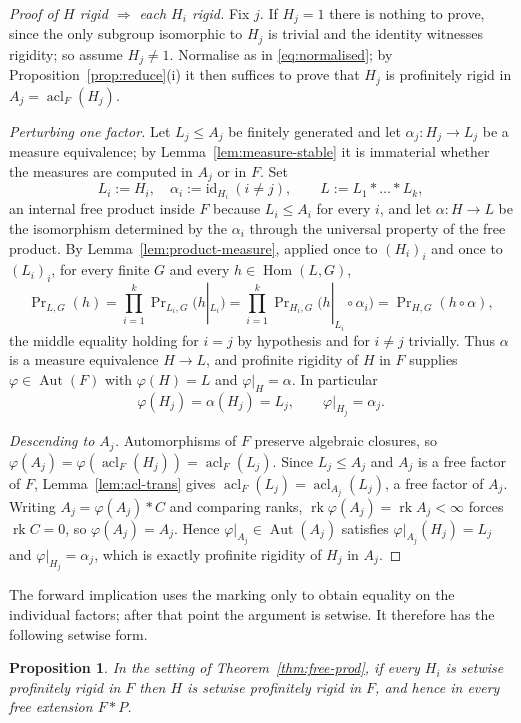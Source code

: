 \documentclass[11pt]{amsart}
\theoremstyle{plain}
\newtheorem{proposition}[theorem]{Proposition}
\theoremstyle{definition}
\newcommand{\acl}{\operatorname{acl}}
\newcommand{\rk}{\operatorname{rk}}
\newcommand{\Hom}{\operatorname{Hom}}
\newcommand{\Aut}{\operatorname{Aut}}
\begin{document}
\begin{proof}[Proof of $H$ rigid $\Rightarrow$ each $H_i$ rigid]
Fix $j$.  If $H_j=1$ there is nothing to prove, since the only subgroup
isomorphic to $H_j$ is trivial and the identity witnesses rigidity; so assume
$H_j\neq1$.  Normalise as in \eqref{eq:normalised}; by
Proposition~\ref{prop:reduce}(i) it then suffices to prove that $H_j$ is
profinitely rigid in $A_j=\acl_F(H_j)$.

\medskip\noindent\emph{Perturbing one factor.}  Let $L_j\le A_j$ be finitely
generated and let $\alpha_j\colon H_j\to L_j$ be a measure equivalence; by
Lemma~\ref{lem:measure-stable} it is immaterial whether the measures are computed
in $A_j$ or in $F$.  Set
\[
  L_i:=H_i,\quad\alpha_i:=\mathrm{id}_{H_i}\ (i\neq j),\qquad
  L:=L_1*\dots*L_k,
\]
an internal free product inside $F$ because $L_i\le A_i$ for every $i$, and let
$\alpha\colon H\to L$ be the isomorphism determined by the $\alpha_i$ through the
universal property of the free product.  By Lemma~\ref{lem:product-measure},
applied once to $(H_i)_i$ and once to $(L_i)_i$, for every finite $G$ and every
$h\in\Hom(L,G)$,
\[
  \Pr\nolimits_{L,G}(h)=\prod_{i=1}^{k}\Pr\nolimits_{L_i,G}\bigl(h|_{L_i}\bigr)
  =\prod_{i=1}^{k}\Pr\nolimits_{H_i,G}\bigl(h|_{L_i}\circ\alpha_i\bigr)
  =\Pr\nolimits_{H,G}(h\circ\alpha),
\]
the middle equality holding for $i=j$ by hypothesis and for $i\neq j$ trivially.
Thus $\alpha$ is a measure equivalence $H\to L$, and profinite
rigidity of $H$ in $F$ supplies $\varphi\in\Aut(F)$ with $\varphi(H)=L$ and
$\varphi|_H=\alpha$.  In particular
\[
  \varphi(H_j)=\alpha(H_j)=L_j,\qquad \varphi|_{H_j}=\alpha_j .
\]

\medskip\noindent\emph{Descending to $A_j$.}  Automorphisms of $F$ preserve
algebraic closures, so $\varphi(A_j)=\varphi(\acl_F(H_j))=\acl_F(L_j)$.  Since
$L_j\le A_j$ and $A_j$ is a free factor of $F$, Lemma~\ref{lem:acl-trans} gives
$\acl_F(L_j)=\acl_{A_j}(L_j)$, a free factor of $A_j$.  Writing
$A_j=\varphi(A_j)*C$ and comparing ranks, $\rk\varphi(A_j)=\rk A_j<\infty$ forces
$\rk C=0$, so $\varphi(A_j)=A_j$.  Hence $\varphi|_{A_j}\in\Aut(A_j)$ satisfies
$\varphi|_{A_j}(H_j)=L_j$ and $\varphi|_{H_j}=\alpha_j$, which is exactly
profinite rigidity of $H_j$ in $A_j$.
\end{proof}

The forward implication uses the marking only to obtain equality on the
individual factors; after that point the argument is setwise.  It therefore has
the following setwise form.

\begin{proposition}\label{prop:free-prod-setwise}
In the setting of Theorem~\ref{thm:free-prod}, if every $H_i$ is setwise
profinitely rigid in $F$ then $H$ is setwise profinitely rigid in $F$, and hence
in every free extension $F*P$.
\end{proposition}
\end{document}
